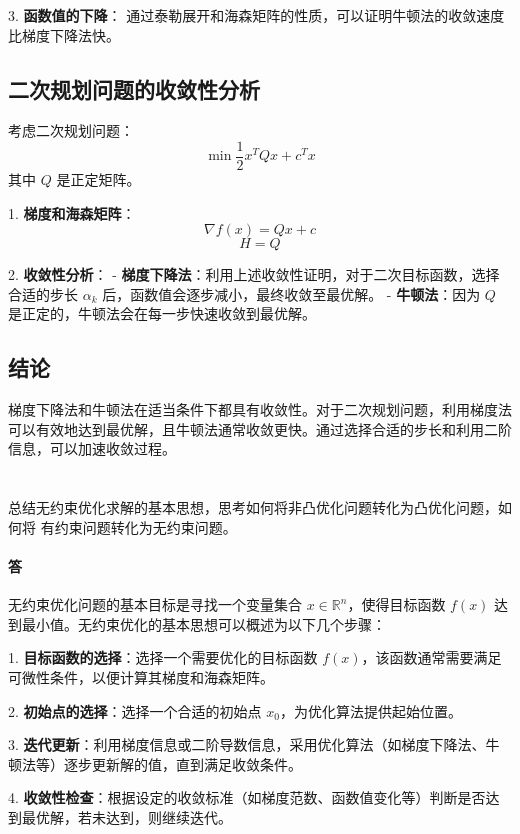 \documentclass[a4paper]{article}
\begin{document}
3. \textbf{函数值的下降}：
   通过泰勒展开和海森矩阵的性质，可以证明牛顿法的收敛速度比梯度下降法快。

\subsection{二次规划问题的收敛性分析}

考虑二次规划问题：
\[
\min \frac{1}{2} x^T Q x + c^T x
\]
其中 $Q$ 是正定矩阵。

1. \textbf{梯度和海森矩阵}：
   \[
   \nabla f(x) = Qx + c
   \]
   \[
   H = Q
   \]

2. \textbf{收敛性分析}：
   - \textbf{梯度下降法}：利用上述收敛性证明，对于二次目标函数，选择合适的步长 $\alpha_k$ 后，函数值会逐步减小，最终收敛至最优解。
   - \textbf{牛顿法}：因为 $Q$ 是正定的，牛顿法会在每一步快速收敛到最优解。

\subsection{结论}

梯度下降法和牛顿法在适当条件下都具有收敛性。对于二次规划问题，利用梯度法可以有效地达到最优解，且牛顿法通常收敛更快。通过选择合适的步长和利用二阶信息，可以加速收敛过程。

\section{}
总结无约束优化求解的基本思想，思考如何将非凸优化问题转化为凸优化问题，如何将
有约束问题转化为无约束问题。

\paragraph{答}

无约束优化问题的基本目标是寻找一个变量集合 $x \in \mathbb{R}^n$，使得目标函数 $f(x)$ 达到最小值。无约束优化的基本思想可以概述为以下几个步骤：

1. \textbf{目标函数的选择}：选择一个需要优化的目标函数 $f(x)$，该函数通常需要满足可微性条件，以便计算其梯度和海森矩阵。

2. \textbf{初始点的选择}：选择一个合适的初始点 $x_0$，为优化算法提供起始位置。

3. \textbf{迭代更新}：利用梯度信息或二阶导数信息，采用优化算法（如梯度下降法、牛顿法等）逐步更新解的值，直到满足收敛条件。

4. \textbf{收敛性检查}：根据设定的收敛标准（如梯度范数、函数值变化等）判断是否达到最优解，若未达到，则继续迭代。
\end{document}

